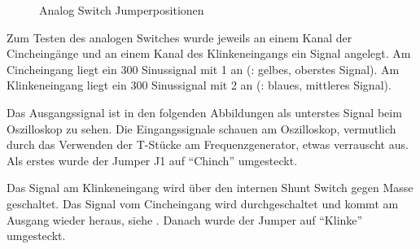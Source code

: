 \begin{figure}[H]
    \centering
    \qquad
    \qquad
    \caption{Analog Switch Jumperpositionen}
    \label{fig:audio-switch-jmp}
\end{figure}


\FloatBarrier
Zum Testen des analogen Switches wurde jeweils an einem Kanal der Cincheingänge und an einem Kanal des Klinkeneingangs ein Signal angelegt. Am Cincheingang liegt ein \unit{300}{\milli\volt} Sinussignal mit \unit{1}{\kilo\hertz} an (: gelbes, oberstes Signal). Am Klinkeneingang liegt ein \unit{300}{\milli\volt} Sinussignal mit \unit{2}{\kilo\hertz} an (: blaues, mittleres Signal).


Das Ausgangssignal ist in den folgenden Abbildungen als unterstes Signal beim Oszilloskop zu sehen. Die Eingangssignale schauen am Oszilloskop, vermutlich durch das Verwenden der T-Stücke am Frequenzgenerator, etwas verrauscht aus. Als erstes wurde der Jumper J1 auf \enquote{Chinch} umgesteckt.


Das Signal am Klinkeneingang wird über den internen Shunt Switch gegen Masse geschaltet. Das Signal vom Cincheingang wird durchgeschaltet und kommt am Ausgang wieder heraus, siehe . Danach wurde der Jumper auf \enquote{Klinke} umgesteckt.

